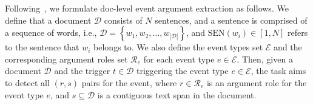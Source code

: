 Following~\citet{rams}, we formulate doc-level event argument extraction as follows.
We define that a document $\mathcal{D}$ consists of $N$ sentences, and a sentence is comprised of a sequence of words, i.e., $\mathcal{D}=\left \{ w_1, w_2, \dots, w_{\left | \mathcal{D} \right | } \right \}$, and $\mathrm{SEN}\left ( w_i \right ) \in \left [1, N\right ]$ refers to the sentence that $w_i$ belongs to.
We also define the event types set $\mathcal{E}$ and the corresponding argument roles set $\mathcal{R}_e$ for each event type $e\in\mathcal{E}$.
Then, given a document $\mathcal{D}$ and the trigger $t\in \mathcal{D}$ triggering the event type $e\in\mathcal{E}$, the task aims to detect all $(r,s)$ pairs for the event, where $r \in \mathcal{R}_e$ is an argument role for the event type $e$, and $s \subseteq  \mathcal{D}$ is a contiguous text span in the document.



